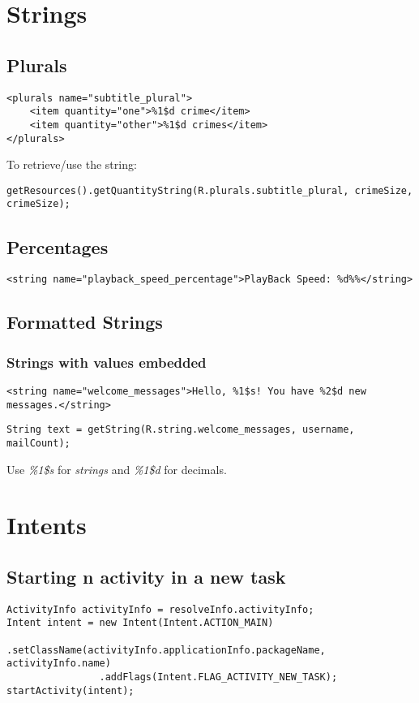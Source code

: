 \documentclass[]{article}
\renewcommand{\it}[1]{\textit{#1}}
\begin{document}
\section{Strings}
\subsection{Plurals}
\begin{lstlisting}
<plurals name="subtitle_plural">
	<item quantity="one">%1$d crime</item>
	<item quantity="other">%1$d crimes</item>
</plurals>
\end{lstlisting}
To retrieve/use the string:
\begin{lstlisting}
getResources().getQuantityString(R.plurals.subtitle_plural, crimeSize, crimeSize);
\end{lstlisting}

\subsection{Percentages}
\begin{lstlisting}
<string name="playback_speed_percentage">PlayBack Speed: %d%%</string>
\end{lstlisting}

\subsection{Formatted Strings}
\subsubsection{Strings with values embedded}
\begin{lstlisting}
<string name="welcome_messages">Hello, %1$s! You have %2$d new messages.</string>
\end{lstlisting}
\begin{lstlisting}
String text = getString(R.string.welcome_messages, username, mailCount);
\end{lstlisting}
Use \it{\%1\$s} for \it{strings} and \it{\%1\$d}  for decimals.

\section{Intents}
\subsection{Starting n activity in a new task}
\begin{lstlisting}
ActivityInfo activityInfo = resolveInfo.activityInfo;
Intent intent = new Intent(Intent.ACTION_MAIN)
				.setClassName(activityInfo.applicationInfo.packageName, activityInfo.name)
				.addFlags(Intent.FLAG_ACTIVITY_NEW_TASK);
startActivity(intent);
\end{lstlisting}
\end{document}
